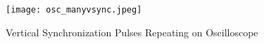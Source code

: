 \begin{figure}[H]
	\centering
	\texttt{[image: osc\_manyvsync.jpeg]}
	\caption{ Vertical Synchronization Pulses Repeating on Oscilloscope }
	\label{fig:oscmanyvsync}  
\end{figure}

\begin{comment}
	\subsubsection{Color Channel}
	\par This system has 3 color channel outputs; red, green, and blue. All three color channels have similar behavior, when observed on an oscilloscope. Therefore, only the red color channel is shown. \newline
	\par The colors are only active during the active region of the VGA frame, which is when the horizontal counter is less than 640 and the vertical counter is less than 480. Although the vertical and horizontal counters are not visible on the oscilloscope, the horizontal synchronization signal can be used as reference. \newline
	\par The active region of the VGA frame is characterized by a high horizontal synchronization signal throughout the whole frame; therefore, the red color channel output signal is observed with respect to the Horizontal Synchronization pulse, in order to determine the correct functionality of the VGA controller. \newline
	\par The color channel takes most of the horizontal synchronization active region pulse, the rest belongs to the blanking region's horizontal front porch and horizontal back porch; which consist of 16 and 48 clock cycles, respectively. \newline
	\par During the blanking region, that consists of the front porch, synchronization pulse, and the back porch, the color channels are forced to 0. Although this is not what is visible in the oscilloscope figure above, this is only due to the present, interfering noise. The visible vibrations and oscillations are caused by the noise in one, two, or all of the following: the VGA port output, the oscilloscope, or the probe connecting the VGA port to the oscilloscope. \newline
	
\end{comment}
